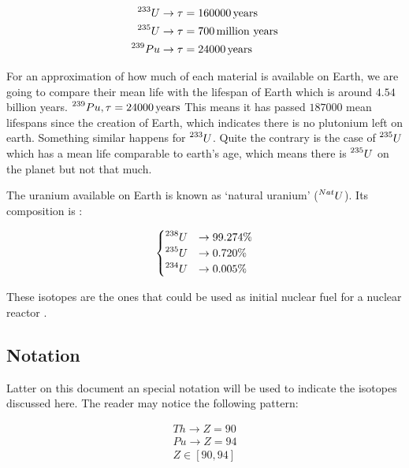 \begin{center}
\begin{align*}
    \prescript{233}{}{U} &\rightarrow \tau = 160000 \, \text{years}\\
    \prescript{235}{}{U} &\rightarrow \tau = 700  \, \text{million years}\\
    \prescript{239}{}{Pu} &\rightarrow \tau = 24000  \, \text{years}
\end{align*}
\end{center}

For an approximation of how much of each material is available on Earth, we are going to compare their mean life with the lifespan of Earth which is around $4.54$ billion years. $\prescript{239}{}{Pu}, \tau = 24000 \, \text{years}$ This means it has passed $187000$ mean lifespans since the creation of Earth, which indicates there is no plutonium left on earth. Something similar happens for $\prescript{233}{}{U}$. Quite the contrary is the case of $\prescript{235}{}{U}$ which has a mean life comparable to earth's age, which means there is $\prescript{235}{}{U}$ on the planet but not that much.

The uranium available on Earth is known as `natural uranium' ($\prescript{Nat}{}{U}$). Its composition is : 

\begin{equation*}
    \begin{cases}
        \prescript{238}{}{U} &\rightarrow 99.274\%\\
        \prescript{235}{}{U} &\rightarrow 0.720\%\\
        \prescript{234}{}{U} &\rightarrow 0.005\%
    \end{cases}
\end{equation*}

These isotopes are the ones that could be used as initial nuclear fuel for a nuclear reactor \cite{Notas_sanabricas}.

\subsection{Notation}

Latter on this document an special notation will be used to indicate the isotopes discussed here. The reader may notice the following pattern:

\begin{align*}
    Th \rightarrow Z=90\\
    Pu \rightarrow Z=94\\
    Z \in [90,94]
\end{align*}

